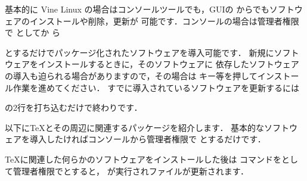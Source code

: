 基本的に Vine Linux の場合はコンソールツールでも，GUIの
からでもソフトウェアのインストールや削除，更新が
可能です．コンソールの場合は管理者権限で  としてか
ら
\begin{InTerm}
\end{InTerm}
とするだけでパッケージ化されたソフトウェアを導入可能です．
新規にソフトウェアをインストールするときに，そのソフトウェアに
依存したソフトウェアの導入も迫られる場合がありますので，その場合は
キー等を押してインストール作業を進めてください．
すでに導入されているソフトウェアを更新するには
\begin{InTerm}
\end{InTerm}
の2行を打ち込むだけで終わりです．

以下に\TeX とその周辺に関連するパッケージを紹介します．
基本的なソフトウェアを導入したければコンソールから管理者権限で
とするだけです．%

\TeX に関連した何らかのソフトウェアをインストールした後は
コマンドをとして管理者権限でとすると，
が実行されファイルが更新されます．

